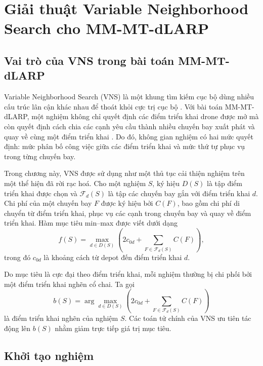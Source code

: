 \chapter{Giải thuật Variable Neighborhood Search cho MM-MT-dLARP}
\label{chap:vns}

\section{Vai trò của VNS trong bài toán MM-MT-dLARP}
\label{sec:vns-role}

Variable Neighborhood Search (VNS) là một khung tìm kiếm cục bộ dùng nhiều cấu trúc lân cận khác nhau để thoát khỏi cực trị cục bộ \cite{mladenovic1997vns,hansen2001vns,hansen2010vns}. Với bài toán MM-MT-dLARP, một nghiệm không chỉ quyết định các điểm triển khai drone được mở mà còn quyết định cách chia các cạnh yêu cầu thành nhiều chuyến bay xuất phát và quay về cùng một điểm triển khai \cite{corberan2025mmdlarp}. Do đó, không gian nghiệm có hai mức quyết định: mức phân bố công việc giữa các điểm triển khai và mức thứ tự phục vụ trong từng chuyến bay.

Trong chương này, VNS được sử dụng như một thủ tục cải thiện nghiệm trên một thể hiện đã rời rạc hoá. Cho một nghiệm \(S\), ký hiệu \(D(S)\) là tập điểm triển khai được chọn và \(\mathcal{F}_d(S)\) là tập các chuyến bay gắn với điểm triển khai \(d\). Chi phí của một chuyến bay \(F\) được ký hiệu bởi \(C(F)\), bao gồm chi phí di chuyển từ điểm triển khai, phục vụ các cạnh trong chuyến bay và quay về điểm triển khai. Hàm mục tiêu min--max được viết dưới dạng
\begin{equation}
f(S) =
\max_{d \in D(S)}
\left(
2c_{0d}
+
\sum_{F \in \mathcal{F}_d(S)} C(F)
\right),
\label{eq:vns-objective}
\end{equation}
trong đó \(c_{0d}\) là khoảng cách từ depot đến điểm triển khai \(d\).

Do mục tiêu là cực đại theo điểm triển khai, mỗi nghiệm thường bị chi phối bởi một điểm triển khai nghẽn cổ chai. Ta gọi
\begin{equation}
b(S) =
\arg\max_{d \in D(S)}
\left(
2c_{0d}
+
\sum_{F \in \mathcal{F}_d(S)} C(F)
\right)
\label{eq:vns-bottleneck}
\end{equation}
là điểm triển khai nghẽn của nghiệm \(S\). Các toán tử chính của VNS ưu tiên tác động lên \(b(S)\) nhằm giảm trực tiếp giá trị mục tiêu.

\section{Khởi tạo nghiệm}
\label{sec:vns-initialization}

